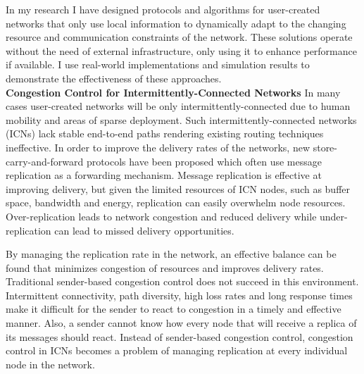 \documentclass[10pt]{article}
\begin{document}
In my research I have designed protocols and algorithms for user-created
networks that only use local
information to dynamically adapt to the changing resource and communication
constraints of the network.  These solutions operate without the need of
external infrastructure, only using it to enhance performance if available.
I use real-world implementations and simulation results to demonstrate the
effectiveness of these approaches. \\



\noindent \textbf{Congestion Control for Intermittently-Connected Networks}
In many cases user-created networks will be only intermittently-connected due to
human mobility and areas of sparse deployment.
Such intermittently-connected networks (ICNs)
lack stable end-to-end paths rendering existing routing techniques ineffective.
In order to improve the
delivery rates of the networks, new store-carry-and-forward protocols have been
proposed which often use message replication as a forwarding mechanism.  
Message
replication is effective at improving delivery, but given the limited
resources of ICN nodes, such as buffer space, bandwidth and energy, 
replication can easily overwhelm
node resources.  Over-replication leads to network congestion and reduced
delivery while under-replication can lead to missed delivery opportunities.  

By managing the replication rate in the network, an effective balance can be
found that minimizes congestion of resources and improves delivery rates.
Traditional sender-based congestion control does not succeed in this
environment.  Intermittent
connectivity, path diversity, high loss rates and long response times
make it difficult for the sender to react to congestion in a timely
and effective manner.  Also, a sender cannot know
how every node that will receive a replica of its messages should
react.  
Instead of sender-based congestion control, congestion control in ICNs
becomes a problem of managing replication at every individual node in the
network.
\end{document}
